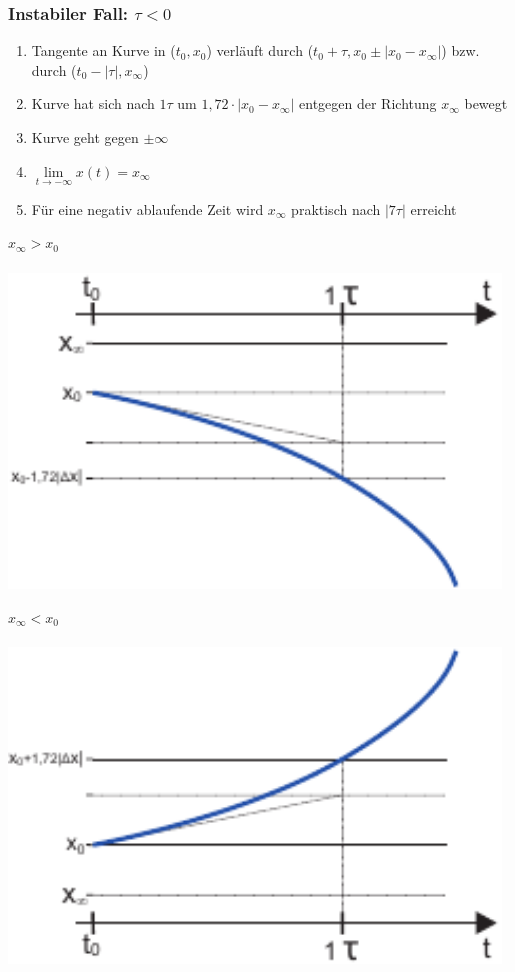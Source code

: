 \documentclass[a4paper,twocolumn,10pt]{article}
\begin{document}
\subsubsection*{Instabiler Fall: $\tau<0$}
\begin{enumerate}[label=-,leftmargin=3mm]
	\item Tangente an Kurve in ($t_0,x_0$) verläuft durch ($t_0+\tau,x_0\pm |x_0-x_\infty|$) bzw. durch ($t_0-|\tau|,x_\infty$)
	\item Kurve hat sich nach $1\tau$ um $1,72\cdot |x_0-x_\infty|$ entgegen der Richtung $x_\infty$ bewegt
	\item Kurve geht gegen $\pm \infty$
	\item $\lim\limits_{t\rightarrow -\infty} x(t)=x_\infty$
	\item Für eine negativ ablaufende Zeit wird $x_\infty$ praktisch nach $|7\tau|$ erreicht
\end{enumerate}
\begin{minipage}[t]{0.23\textwidth}
$x_\infty > x_0$\\\\
\includegraphics[width=0.98\textwidth]{Grafiken/Zeitverlauf3}\\
\end{minipage}
\hfill
\begin{minipage}[t]{0.23\textwidth}
$x_\infty < x_0$\\\\
\includegraphics[width=0.98\textwidth]{Grafiken/Zeitverlauf4}\\
\end{minipage}
\end{document}
